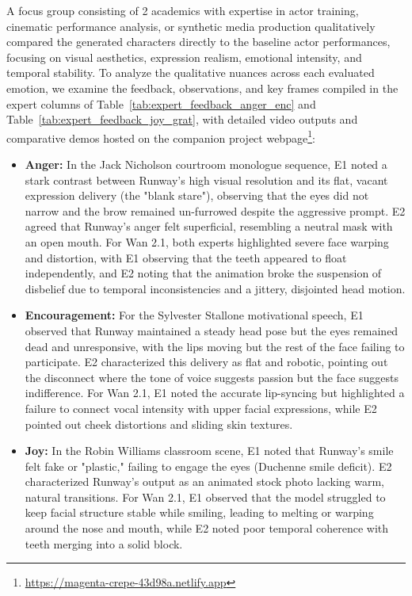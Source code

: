 \documentclass[pdflatex,sn-mathphys-num]{sn-jnl}
\newcommand{\emAnger}{Anger\xspace}
\newcommand{\emEncouragement}{Encouragement\xspace}
\newcommand{\emJoy}{Joy\xspace}
\newcommand{\Eone}{\colorbox{gray!15}{E1}\xspace}
\newcommand{\Etwo}{\colorbox{gray!30}{E2}\xspace}
\theoremstyle{thmstyleone}
\theoremstyle{thmstyletwo}
\theoremstyle{thmstylethree}
\begin{document}
A focus group consisting of 2 academics with expertise in actor training, cinematic performance analysis, or synthetic media production qualitatively compared the generated characters directly to the baseline actor performances, focusing on visual aesthetics, expression realism, emotional intensity, and temporal stability. To analyze the qualitative nuances across each evaluated emotion, we examine the feedback, observations, and key frames compiled in the expert columns of Table~\ref{tab:expert_feedback_anger_enc} and Table~\ref{tab:expert_feedback_joy_grat}, with detailed video outputs and comparative demos hosted on the companion project webpage\footnote{\url{https://magenta-crepe-43d98a.netlify.app}}:
\begin{itemize}
    \item \textbf{\emAnger:} In the Jack Nicholson courtroom monologue sequence, \Eone noted a stark contrast between Runway's high visual resolution and its flat, vacant expression delivery (the "blank stare"), observing that the eyes did not narrow and the brow remained un-furrowed despite the aggressive prompt. \Etwo agreed that Runway's anger felt superficial, resembling a neutral mask with an open mouth. For Wan 2.1, both experts highlighted severe face warping and distortion, with \Eone observing that the teeth appeared to float independently, and \Etwo noting that the animation broke the suspension of disbelief due to temporal inconsistencies and a jittery, disjointed head motion.
    \item \textbf{\emEncouragement:} For the Sylvester Stallone motivational speech, \Eone observed that Runway maintained a steady head pose but the eyes remained dead and unresponsive, with the lips moving but the rest of the face failing to participate. \Etwo characterized this delivery as flat and robotic, pointing out the disconnect where the tone of voice suggests passion but the face suggests indifference. For Wan 2.1, \Eone noted the accurate lip-syncing but highlighted a failure to connect vocal intensity with upper facial expressions, while \Etwo pointed out cheek distortions and sliding skin textures.
    \item \textbf{\emJoy:} In the Robin Williams classroom scene, \Eone noted that Runway's smile felt fake or "plastic," failing to engage the eyes (Duchenne smile deficit). \Etwo characterized Runway's output as an animated stock photo lacking warm, natural transitions. For Wan 2.1, \Eone observed that the model struggled to keep facial structure stable while smiling, leading to melting or warping around the nose and mouth, while \Etwo noted poor temporal coherence with teeth merging into a solid block.

\end{itemize}
\end{document}
